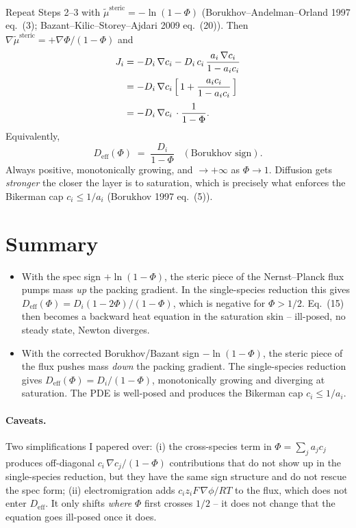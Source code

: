 \documentclass[11pt]{article}
\newcommand{\Deff}{D_{\mathrm{eff}}}
\newcommand{\steric}{\mathrm{steric}}
\begin{document}
Repeat Steps 2--3 with $\tilde\mu^{\steric} = -\ln(1-\Phi)$
(Borukhov--Andelman--Orland 1997 eq.~(3); Bazant--Kilic--Storey--Ajdari
2009 eq.~(20)). Then $\nabla\tilde\mu^{\steric} = +\nabla\Phi/(1-\Phi)$
and
\begin{align}
  J_i &= -D_i\,\nabla c_i
        - D_i\, c_i\, \frac{a_i\,\nabla c_i}{1 - a_i c_i}
                                                       \nonumber \\[2pt]
      &= -D_i\,\nabla c_i\,
         \Bigl[\,1 + \frac{a_i c_i}{1 - a_i c_i}\,\Bigr]
                                                       \nonumber \\[2pt]
      &= -D_i\,\nabla c_i\, \cdot \frac{1}{1-\Phi}.
  \label{eq:Jcorrected}
\end{align}
Equivalently,
\begin{equation}
\boxed{\;
   \Deff(\Phi) \;=\; \frac{D_i}{1-\Phi}\;\;\;(\text{Borukhov sign}).
\;}
\end{equation}
Always positive, monotonically growing, and $\to +\infty$ as $\Phi \to
1$. Diffusion gets \emph{stronger} the closer the layer is to
saturation, which is precisely what enforces the Bikerman cap
$c_i \le 1/a_i$ (Borukhov 1997 eq.~(5)).

\section*{Summary}

\begin{itemize}
\item With the spec sign $+\ln(1-\Phi)$, the steric piece of the
      Nernst--Planck flux pumps mass \emph{up} the packing gradient.
      In the single-species reduction this gives
      $\Deff(\Phi) = D_i (1-2\Phi)/(1-\Phi)$, which is negative for
      $\Phi > 1/2$. Eq.~(15) then becomes a backward heat equation in
      the saturation skin -- ill-posed, no steady state, Newton
      diverges.
\item With the corrected Borukhov/Bazant sign $-\ln(1-\Phi)$, the
      steric piece of the flux pushes mass \emph{down} the packing
      gradient. The single-species reduction gives
      $\Deff(\Phi) = D_i/(1-\Phi)$, monotonically growing and
      diverging at saturation. The PDE is well-posed and produces the
      Bikerman cap $c_i \le 1/a_i$.
\end{itemize}

\paragraph{Caveats.} Two simplifications I papered over:
(i) the cross-species term in $\Phi = \sum_j a_j c_j$ produces
off-diagonal $c_i\,\nabla c_j/(1-\Phi)$ contributions that do not show
up in the single-species reduction, but they have the same sign
structure and do not rescue the spec form;
(ii) electromigration adds $c_i z_i F\,\nabla\phi/RT$ to the flux,
which does not enter $\Deff$. It only shifts \emph{where} $\Phi$ first
crosses $1/2$ -- it does not change that the equation goes ill-posed
once it does.
\end{document}
